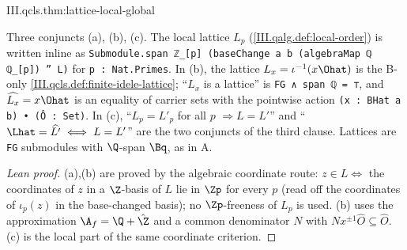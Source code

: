 \begin{theorem}
\end{theorem}
\begin{tfformal}{III.qcls.thm:lattice-local-global}
\begin{tffidelity}
Three conjuncts (a), (b), (c). The local lattice $L_p$ (\cref{III.qalg.def:local-order}) is written inline as \texttt{Submodule.span ℤ\_[p] (baseChange a b (algebraMap ℚ ℚ\_[p]) '' L)} for \texttt{p : Nat.Primes}. In (b), the lattice $L_x=\iota^{-1}(x\Ohat)$ is the B-only \cref{III.qcls.def:finite-idele-lattice}; ``$L_x$ is a lattice'' is \texttt{FG ∧ span ℚ = ⊤}, and $\widehat{L_x}=x\Ohat$ is an equality of carrier sets with the pointwise action \texttt{(x : BHat a b) • (Ô : Set)}. In (c), ``$L_p=L'_p$ for all $p$ $\Rightarrow L=L'$'' and ``$\Lhat=\widehat{L'}\iff L=L'$'' are the two conjuncts of the third clause. Lattices are \texttt{FG} submodules with $\Q$-span $\Bq$, as in A.
\end{tffidelity}
\end{tfformal}
\begin{proof}[Lean proof]
(a),(b) are proved by the algebraic coordinate route: $z\in L\iff$ the coordinates of $z$ in a $\Z$-basis of $L$ lie in $\Zp$ for every $p$ (read off the coordinates of $\iota_p(z)$ in the base-changed basis); no $\Zp$-freeness of $L_p$ is used. (b) uses the approximation $\A_f=\Q+\hat{\Z}$ and a common denominator $N$ with $Nx^{\pm1}\hat O\subseteq\hat O$. (c) is the local part of the same coordinate criterion.
\end{proof}

